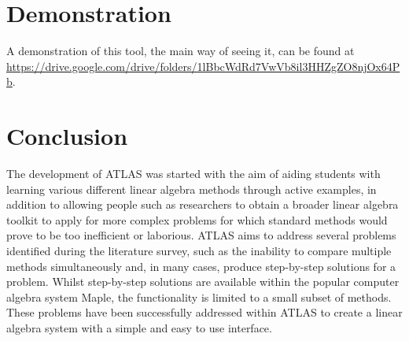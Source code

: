 \documentclass[natbib]{llncs}
\begin{document}
\section{Demonstration}
A demonstration of this tool, the main way of seeing it, can be found at \hfil\break\url{https://drive.google.com/drive/folders/1lBbcWdRd7VwVb8il3HHZgZO8njOx64Pb}.

\section{Conclusion}
The development of ATLAS was started with the aim of aiding students with learning various different linear algebra methods through active examples, in addition to allowing people such as researchers to obtain a broader linear algebra toolkit to apply for more complex problems for which standard methods would prove to be too inefficient or laborious. ATLAS aims to address several problems identified during the literature survey, such as the inability to compare multiple methods simultaneously and, in many cases, produce step-by-step solutions for a problem. Whilst step-by-step solutions are available within the popular computer algebra system Maple, the functionality is limited to a small subset of methods. These problems have been successfully addressed within ATLAS to create a linear algebra system with a simple and easy to use interface.

\def\href{\url}\def\path{\url}

\end{document}
